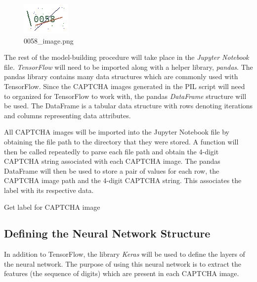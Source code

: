 \documentclass[11pt,conference]{IEEEtran}
\begin{document}
\begin{figure}[htbp]
	\centerline{\includegraphics[scale=1.5]{images/0058_image.png}}
	\caption{0058\_image.png}
	\label{figure}
\end{figure}

The rest of the model-building procedure will take place in the \emph{Jupyter
Notebook}
file. \emph{TensorFlow} will need to be imported along with a helper library,
\emph{pandas}. The pandas library contains many data structures which are
commonly used with TensorFlow. Since the CAPTCHA images generated in
the PIL script will need to organized for TensorFlow to work with, the pandas
\emph{DataFrame} structure will be used. The DataFrame is a tabular data
structure with rows denoting iterations and columns representing data
attributes.

All CAPTCHA images will be imported into the Jupyter Notebook file by obtaining
the file path to the directory that they were stored. A function will then
be called repeatedly to parse each file path and obtain the 4-digit CAPTCHA string associated with each
CAPTCHA image. The pandas DataFrame will then be used to store a pair of values
for each row, the CAPTCHA image path and the 4-digit CAPTCHA string. This
associates the label with its respective data.


\begin{algorithm}[]

  \caption{Get label for CAPTCHA image}
  \label{alg:exep}
\end{algorithm}

\subsection{Defining the Neural Network Structure}
In addition to TensorFlow, the library \emph{Keras} will be used to define the
layers of the neural network. The purpose of using this neural network is to extract the features
(the sequence of digits) which are present in each CAPTCHA image.
\end{document}
